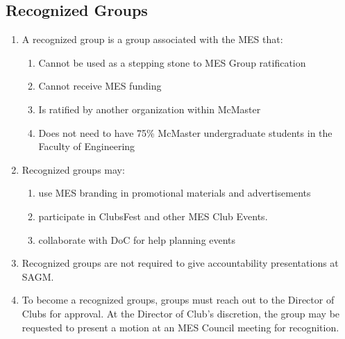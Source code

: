 \subsection{Recognized Groups}
\label{recognized-groups}
\begin{enumerate}
 \item
  A recognized group is a group associated with the MES that:

  \begin{enumerate}
   \item
    Cannot be used as a stepping stone to MES Group ratification
   \item
    Cannot receive MES funding
   \item
    Is ratified by another organization within McMaster
   \item
    Does not need to have 75\% McMaster undergraduate students in the Faculty of Engineering
  \end{enumerate}
 \item
  Recognized groups may:

  \begin{enumerate}
   \item
    use MES branding in promotional materials and advertisements
   \item
    participate in ClubsFest and other MES Club Events.
   \item
    collaborate with DoC for help planning events
  \end{enumerate}
 \item
  Recognized groups are not required to give accountability presentations at SAGM.
 \item
  To become a recognized groups, groups must reach out to the Director of Clubs for approval. At the Director of Club's discretion, the group may be requested to present a motion at an MES Council meeting for recognition.
\end{enumerate}


